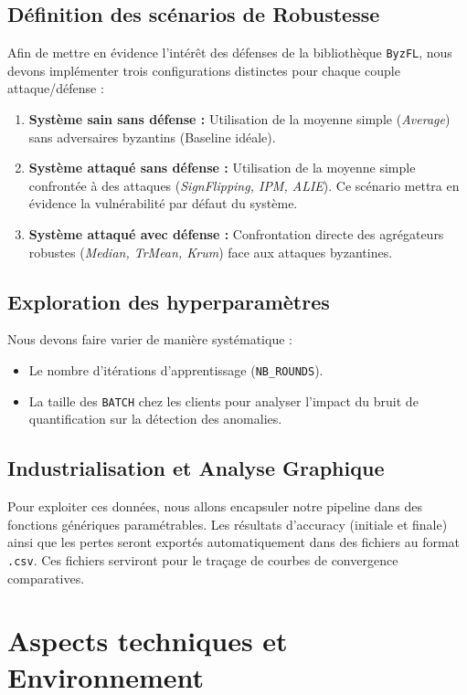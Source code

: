 \documentclass[11pt, a4paper]{article}
\begin{document}
\subsection{Définition des scénarios de Robustesse }
Afin de mettre en évidence l'intérêt des défenses de la bibliothèque \texttt{ByzFL}, nous devons implémenter trois configurations distinctes pour chaque couple attaque/défense :
\begin{enumerate}
    \item \textbf{Système sain sans défense :} Utilisation de la moyenne simple (\textit{Average}) sans adversaires byzantins (Baseline idéale).
    \item \textbf{Système attaqué sans défense :} Utilisation de la moyenne simple confrontée à des attaques (\textit{SignFlipping, IPM, ALIE}). Ce scénario mettra en évidence la vulnérabilité par défaut du système.
    \item \textbf{Système attaqué avec défense :} Confrontation directe des agrégateurs robustes (\textit{Median, TrMean, Krum}) face aux attaques byzantines.
\end{enumerate}

\subsection{Exploration des hyperparamètres}
Nous devons faire varier de manière systématique :
\begin{itemize}
    \item Le nombre d'itérations d'apprentissage (\texttt{NB\_ROUNDS}).
    \item La taille des \texttt{BATCH} chez les clients pour analyser l'impact du bruit de quantification sur la détection des anomalies.
\end{itemize}

\subsection{Industrialisation et Analyse Graphique}
Pour exploiter ces données, nous allons encapsuler notre pipeline dans des fonctions génériques paramétrables. Les résultats d'accuracy (initiale et finale) ainsi que les pertes seront exportés automatiquement dans des fichiers au format \texttt{.csv}. Ces fichiers serviront pour le traçage de courbes de convergence comparatives.

\section{Aspects techniques et Environnement}
\end{document}
